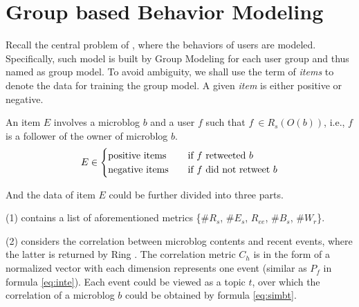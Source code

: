 \section{Group based Behavior Modeling}
\label{sec:gm}


Recall the central problem of \sys{}, where the \retg{} behaviors of users are modeled.
Specifically, such model is built by Group Modeling for each user group and thus named as group model.
To avoid ambiguity, we shall use the term of \textit{items} to denote the data for training the group model.
A given \textit{item} is either positive or negative.

\begin{definition}
\label{def:gm-it}
An item $E$ involves a microblog $b$ and a user $f$ such that $f\ \in R_s(O(b))$, i.e., $f$ is a follower of  the owner of microblog $b$.
\begin{equation}
\label{eq:gm-it}
E \in
  \begin{cases}
    \text{positive items}       & \quad \text{if } f \text{ retweeted{} } b\\
    \text{negative items}  		& \quad \text{if } f \text{ did not retweet{} } b
  \end{cases}
\end{equation}
\end{definition}

And the data of item $E$ could be further divided into three parts.

	\stab(1)  contains a list of aforementioned metrics \{\#$R_s$, \#$E_s$, $R_{ee}$, \#$B_s$, \#$W_r$\}.
	
	\stab(2)  considers the correlation between microblog contents and recent events, where the latter is returned by Ring \cite{IEEEexample:ring}. The correlation metric $C_h$ is in the form of a normalized vector with each dimension represents one event (similar as $P_f$ in formula \ref{eq:inte}). Each event could be viewed as a topic $t$, over which the correlation of a microblog $b$ could be obtained by formula \ref{eq:simbt}.
	

